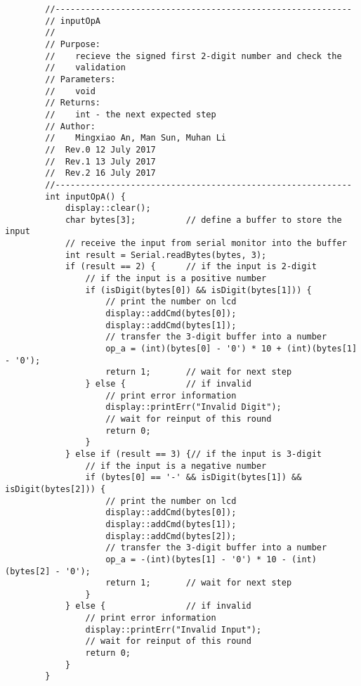\begin{verbatim}
        //-----------------------------------------------------------  
        // inputOpA 
        //  
        // Purpose:  
        //    recieve the signed first 2-digit number and check the 
        //    validation
        // Parameters:  
        //    void 
        // Returns:  
        //    int - the next expected step   
        // Author:  
        //    Mingxiao An, Man Sun, Muhan Li
        //  Rev.0 12 July 2017
        //  Rev.1 13 July 2017
        //  Rev.2 16 July 2017
        //-----------------------------------------------------------
        int inputOpA() {
            display::clear();
            char bytes[3];          // define a buffer to store the input
            // receive the input from serial monitor into the buffer
            int result = Serial.readBytes(bytes, 3);
            if (result == 2) {      // if the input is 2-digit
                // if the input is a positive number
                if (isDigit(bytes[0]) && isDigit(bytes[1])) {
                    // print the number on lcd
                    display::addCmd(bytes[0]);
                    display::addCmd(bytes[1]);
                    // transfer the 3-digit buffer into a number
                    op_a = (int)(bytes[0] - '0') * 10 + (int)(bytes[1] - '0');
                    return 1;       // wait for next step
                } else {            // if invalid
                    // print error information
                    display::printErr("Invalid Digit");
                    // wait for reinput of this round
                    return 0;
                }
            } else if (result == 3) {// if the input is 3-digit
                // if the input is a negative number
                if (bytes[0] == '-' && isDigit(bytes[1]) && isDigit(bytes[2])) {
                    // print the number on lcd
                    display::addCmd(bytes[0]);
                    display::addCmd(bytes[1]);
                    display::addCmd(bytes[2]);
                    // transfer the 3-digit buffer into a number
                    op_a = -(int)(bytes[1] - '0') * 10 - (int)(bytes[2] - '0');
                    return 1;       // wait for next step
                }
            } else {                // if invalid
                // print error information
                display::printErr("Invalid Input");
                // wait for reinput of this round
                return 0;
            }
        }


\end{verbatim}
